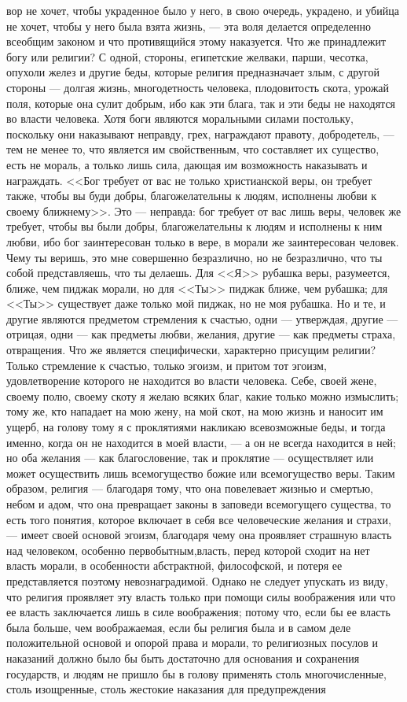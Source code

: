 \documentclass[12pt]{article}
\begin{document}
вор не хочет, чтобы украденное было у него, в свою очередь, украдено, и убийца не хочет, чтобы у него была взята жизнь, --- эта воля делается определенно всеобщим законом и что противящийся этому наказуется. Что же принадлежит богу или религии? С одной, стороны, египетские желваки, парши, чесотка, опухоли желез и другие беды, которые религия предназначает злым, с другой стороны --- долгая жизнь, многодетность человека, плодовитость скота, урожай поля, которые она сулит добрым, ибо как эти блага, так и эти беды не находятся во власти человека. Хотя боги являются моральными силами постольку, поскольку они наказывают неправду, грех, награждают правоту, добродетель, --- тем не менее то, что является им свойственным, что составляет их существо, есть не мораль, а только лишь сила, дающая им возможность наказывать и награждать. <<Бог требует от вас не только христианской веры, он требует также, чтобы вы буди добры, благожелательны к людям, исполнены любви к своему ближнему>>. Это --- неправда: бог требует от вас лишь веры, человек же требует, чтобы вы были добры, благожелательны к людям и исполнены к ним любви, ибо бог заинтересован только в вере, в морали же заинтересован человек. Чему ты веришь, это мне совершенно безразлично, но не безразлично, что ты собой представляешь, что ты делаешь. Для <<Я>> рубашка веры, разумеется, ближе, чем пиджак морали, но для <<Ты>> пиджак ближе, чем рубашка; для <<Ты>> существует даже только мой пиджак, но не моя рубашка. Но и те, и другие являются предметом стремления к счастью, одни --- утверждая, другие --- отрицая, одни --- как предметы любви, желания, другие --- как предметы страха, отвращения. Что же является специфически, характерно присущим религии? Только стремление к счастью, только эгоизм, и притом тот эгоизм, удовлетворение которого не находится во власти человека. Себе, своей жене, своему полю, своему скоту я желаю всяких благ, какие только можно измыслить; тому же, кто нападает на мою жену, на мой скот, на мою жизнь и наносит им ущерб, на голову тому я с проклятиями накликаю всевозможные беды, и тогда именно, когда он не находится в моей власти, --- а он не всегда находится в ней; но оба желания --- как благословение, так и проклятие --- осуществляет или может осуществить лишь всемогущество божие или всемогущество веры. Таким образом, религия --- благодаря тому, что она повелевает жизнью и смертью, небом и адом, что она превращает законы в заповеди всемогущего существа, то есть того понятия, которое включает в себя все человеческие желания и страхи, --- имеет своей основой эгоизм, благодаря чему она проявляет страшную власть над человеком, особенно первобытным,власть, перед которой сходит на нет власть морали, в особенности абстрактной, философской, и потеря ее представляется поэтому невознаградимой. Однако не следует упускать из виду, что религия проявляет эту власть только при помощи силы воображения или что ее власть заключается лишь в силе воображения; потому что, если бы ее власть была больше, чем воображаемая, если бы религия была и в самом деле положительной основой и опорой права и морали, то религиозных посулов и наказаний должно было бы быть достаточно для основания и сохранения государств, и людям не пришло бы в голову применять столь многочисленные, столь изощренные, столь жестокие наказания для предупреждения 
\end{document}
